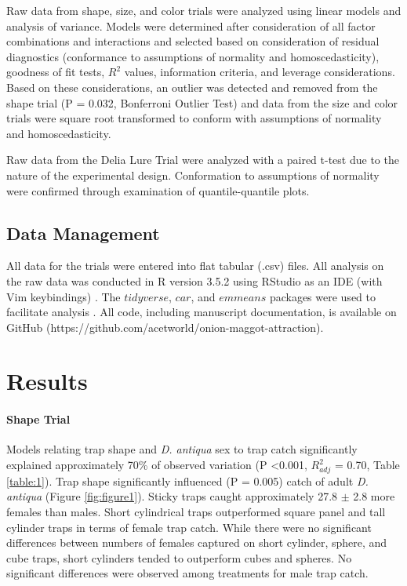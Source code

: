 \documentclass[alpha-refs]{wiley-article}
\begin{document}
Raw data from shape, size, and color trials were analyzed using linear models and analysis of variance.  Models were determined after consideration of all factor combinations and interactions and selected based on consideration of residual diagnostics (conformance to assumptions of normality and homoscedasticity), goodness of fit tests, $R^2$ values, information criteria, and leverage considerations. Based on these considerations, an outlier was detected and removed from the shape trial (P = 0.032, Bonferroni Outlier Test) and data from the size and color trials were square root transformed to conform with assumptions of normality and homoscedasticity.    

Raw data from the Delia Lure Trial were analyzed with a paired t-test due to the nature of the experimental design.  Conformation to assumptions of normality were confirmed through examination of quantile-quantile plots.

\subsection{Data Management}

All data for the trials were entered into flat tabular (.csv) files.  All analysis on the raw data was conducted in R version 3.5.2 using RStudio as an IDE (with Vim keybindings) \citep{rcore2018,rstudio}.  The $tidyverse$, $car$, and $emmeans$ packages were used to facilitate analysis \citep{tidy, car, emmeans}.  All code, including manuscript documentation, is available on GitHub (https://github.com/acetworld/onion-maggot-attraction).

\section{Results}


\paragraph{Shape Trial} Models relating trap shape and \textit{D. antiqua} sex to trap catch significantly explained approximately 70\% of observed variation (P \textless 0.001, $R^2_{adj}$ = 0.70, Table \ref{table:1}).  Trap shape significantly influenced (P = 0.005) catch of adult \textit{D. antiqua} (Figure \ref{fig:figure1}).  Sticky traps caught approximately 27.8 $\pm$ 2.8 more females than males.  Short cylindrical traps outperformed square panel and tall cylinder traps in terms of female trap catch.  While there were no significant differences between numbers of females captured on short cylinder, sphere, and cube traps, short cylinders tended to outperform cubes and spheres.  No significant differences were observed among treatments for male trap catch.  
\end{document}
